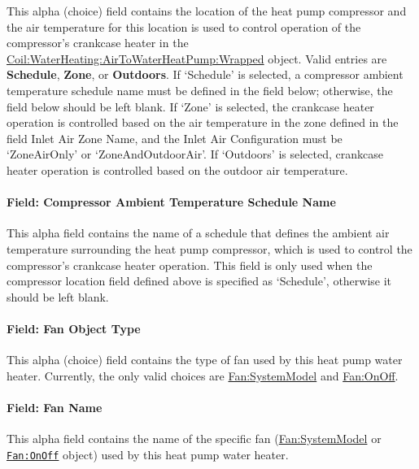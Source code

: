 This alpha (choice) field contains the location of the heat pump compressor and the air temperature for this location is used to control operation of the compressor's crankcase heater in the \hyperref[coilwaterheatingairtowaterheatpumpwrapped]{Coil:WaterHeating:AirToWaterHeatPump:Wrapped} object. Valid entries are \textbf{Schedule}, \textbf{Zone}, or \textbf{Outdoors}. If `Schedule' is selected, a compressor ambient temperature schedule name must be defined in the field below; otherwise, the field below should be left blank. If `Zone' is selected, the crankcase heater operation is controlled based on the air temperature in the zone defined in the field Inlet Air Zone Name, and the Inlet Air Configuration must be `ZoneAirOnly' or `ZoneAndOutdoorAir'. If `Outdoors' is selected, crankcase heater operation is controlled based on the outdoor air temperature.

\paragraph{Field: Compressor Ambient Temperature Schedule Name}\label{field-compressor-ambient-temperature-schedule-name-1}

This alpha field contains the name of a schedule that defines the ambient air temperature surrounding the heat pump compressor, which is used to control the compressor's crankcase heater operation. This field is only used when the compressor location field defined above is specified as `Schedule', otherwise it should be left blank.

\paragraph{Field: Fan Object Type}\label{field-fan-object-type-1}

This alpha (choice) field contains the type of fan used by this heat pump water heater. Currently, the only valid choices are \hyperref[fansystemmodel]{Fan:SystemModel} and \hyperref[fanonoff]{Fan:OnOff}.

\paragraph{Field: Fan Name}\label{field-fan-name-1-000}

This alpha field contains the name of the specific fan (\hyperref[fansystemmodel]{Fan:SystemModel} or \hyperref[fanonoff]{\lstinline!Fan:OnOff!} object) used by this heat pump water heater.

